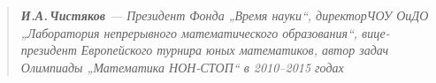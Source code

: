 \begin{quote}
\itshape {\bfseries И.А.\,Чистяков} — Президент Фонда „Время науки“, директор\linebreak ЧОУ ОиДО „Лаборатория непрерывного математического образования“, вице-президент Европейского турнира юных математиков, автор задач Олимпиады „Математика НОН-СТОП“ в 2010–2015 годах
\end{quote}